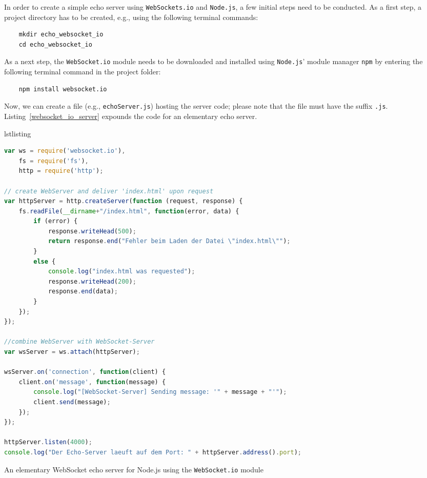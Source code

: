 \documentclass[a4paper, justified, notoc]{tufte-handout} %
\makeatletter
\newenvironment{listing}[1][htbp] %
  {\ifvmode\else\unskip\fi\begin{@tufte@float}[#1]{lstlisting}{}}
  {\end{@tufte@float} } %
\makeatother
\begin{document}
In order to create a simple echo server using \texttt{WebSockets.io} and \texttt{Node.js}, a few initial steps need to be conducted.
As a first step, a project directory has to be created, e.g., using the following terminal commands:
\begin{Verbatim}
	mkdir echo_websocket_io
	cd echo_websocket_io
\end{Verbatim} 
As a next step, the \texttt{WebSocket.io} module needs to be downloaded and installed using \texttt{Node.js}' module manager \texttt{npm} by entering the following terminal command in the project folder:
\begin{Verbatim}
	npm install websocket.io
\end{Verbatim}
Now, we can create a file (e.g., \texttt{echoServer.js}) hosting the server code; please note that the file must have the suffix \texttt{.js}. Listing~\ref{websocket_io_server} expounds the code for an elementary echo server.
\begin{listing}%
\begin{lstlisting}[language=JavaScript]
var ws = require('websocket.io'),
    fs = require('fs'),
    http = require('http');

// create WebServer and deliver 'index.html' upon request
var httpServer = http.createServer(function (request, response) {
    fs.readFile(__dirname+"/index.html", function(error, data) {
        if (error) {
            response.writeHead(500);
            return response.end("Fehler beim Laden der Datei \"index.html\"");
        } 
        else {
            console.log("index.html was requested");
            response.writeHead(200);
            response.end(data);
        }
    }); 
});

//combine WebServer with WebSocket-Server
var wsServer = ws.attach(httpServer);

wsServer.on('connection', function(client) {
    client.on('message', function(message) {
        console.log("[WebSocket-Server] Sending message: '" + message + "'");
        client.send(message);
    });
});

httpServer.listen(4000);
console.log("Der Echo-Server laeuft auf dem Port: " + httpServer.address().port);
\end{lstlisting}
	\caption{An elementary WebSocket echo server for Node.js using the \texttt{WebSocket.io} module} 
	\label{websocket_io_server}
\end{listing}
\end{document}
